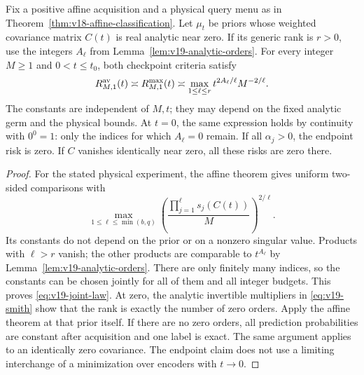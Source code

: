 \begin{theorem}
\label{thm:v19-analytic-memory}
Fix a positive affine acquisition and a physical query menu as in
Theorem~\ref{thm:v18-affine-classification}. Let $\mu_t$ be priors
whose weighted covariance matrix $C(t)$ is real analytic near zero.
If its generic rank is $r>0$, use the integers $A_\ell$ from
Lemma~\ref{lem:v19-analytic-orders}. For every integer $M\ge1$ and
$0<t\le t_0$, both checkpoint criteria satisfy
\begin{equation}\label{eq:v19-joint-law}
 R^{\rm av}_{M,1}(t)\asymp R^{\rm max}_{M,1}(t)
 \asymp\max_{1\le\ell\le r}
                 t^{2A_\ell/\ell}M^{-2/\ell}.
\end{equation}
The constants are independent of $M,t$; they may depend on the fixed
analytic germ and the physical bounds. At $t=0$, the same expression
holds by continuity with $0^0=1$: only the indices for which
$A_\ell=0$ remain. If all $\alpha_j>0$, the endpoint risk is zero.
If $C$ vanishes identically near zero, all these risks are zero there.
\end{theorem}
\begin{proof}
For the stated physical experiment, the affine theorem gives uniform
two-sided comparisons with
\[
 \max_{1\le\ell\le\min(b,q)}
 \left(\frac{\prod_{j=1}^{\ell}s_j(C(t))}{M}\right)^{2/\ell}.
\]
Its constants do not depend on the prior or on a nonzero singular
value. Products with $\ell>r$ vanish; the other products are comparable
to $t^{A_\ell}$ by Lemma~\ref{lem:v19-analytic-orders}. There are
only finitely many indices, so the constants can be chosen jointly
for all of them and all integer budgets. This proves
\eqref{eq:v19-joint-law}. At zero, the analytic invertible
multipliers in \eqref{eq:v19-smith} show that the rank is exactly
the number of zero orders. Apply the affine theorem at that prior
itself. If there are no zero orders, all prediction probabilities
are constant after acquisition and one label is exact. The same
argument applies to an identically zero covariance. The endpoint
claim does not use a limiting interchange of a minimization over
encoders with $t\to0$.
\end{proof}

